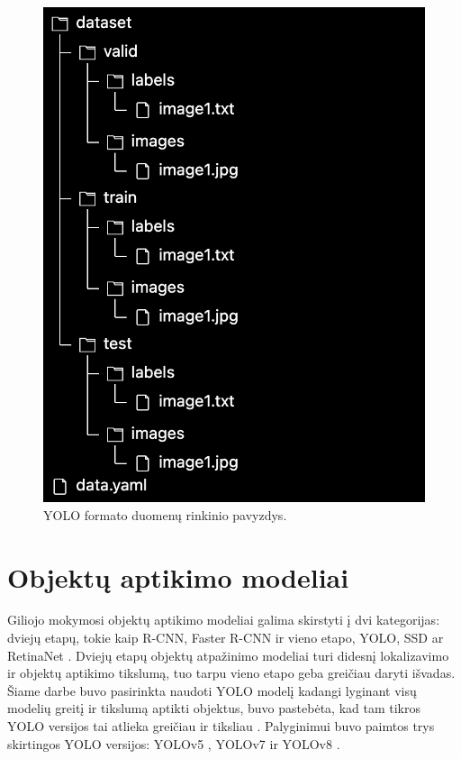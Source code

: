 \documentclass{VUMIFPSkursinis}
\begin{document}
\begin{figure}[H]
    \centering
    \includegraphics[scale=0.6]{img/config_dataset.png}
    \caption{YOLO formato duomenų rinkinio pavyzdys.}
    \label{img:config_dataset.png}
\end{figure}

\section{Objektų aptikimo modeliai}
Giliojo mokymosi objektų aptikimo modeliai galima skirstyti į dvi kategorijas: dviejų etapų, tokie kaip R-CNN, Faster R-CNN ir vieno etapo, YOLO, SSD ar RetinaNet \cite{jiao2019survey}. Dviejų etapų objektų atpažinimo modeliai turi didesnį lokalizavimo ir objektų aptikimo tikslumą, tuo tarpu vieno etapo geba greičiau daryti išvadas. Šiame darbe buvo pasirinkta naudoti YOLO modelį kadangi lyginant visų modelių greitį ir tikslumą aptikti objektus, buvo pastebėta, kad tam tikros YOLO versijos tai atlieka greičiau ir tiksliau \cite{wang2022yolov7}. Palyginimui buvo paimtos trys skirtingos YOLO versijos: YOLOv5 \cite{Jocher_YOLOv5_by_Ultralytics_2020}, YOLOv7 ir YOLOv8 \cite{Jocher_YOLO_by_Ultralytics_2023}. 
\end{document}
